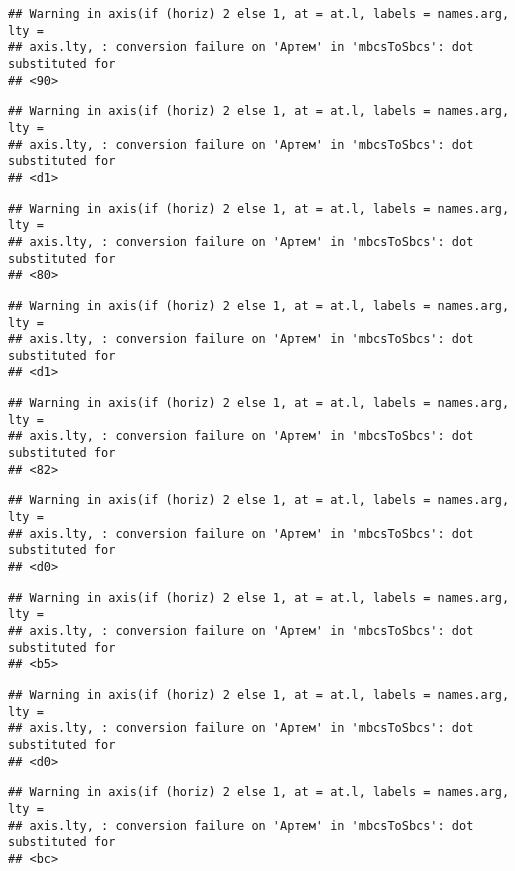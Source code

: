 \documentclass[
]{article}
\begin{document}
\begin{verbatim}
## Warning in axis(if (horiz) 2 else 1, at = at.l, labels = names.arg, lty =
## axis.lty, : conversion failure on 'Артем' in 'mbcsToSbcs': dot substituted for
## <90>
\end{verbatim}

\begin{verbatim}
## Warning in axis(if (horiz) 2 else 1, at = at.l, labels = names.arg, lty =
## axis.lty, : conversion failure on 'Артем' in 'mbcsToSbcs': dot substituted for
## <d1>
\end{verbatim}

\begin{verbatim}
## Warning in axis(if (horiz) 2 else 1, at = at.l, labels = names.arg, lty =
## axis.lty, : conversion failure on 'Артем' in 'mbcsToSbcs': dot substituted for
## <80>
\end{verbatim}

\begin{verbatim}
## Warning in axis(if (horiz) 2 else 1, at = at.l, labels = names.arg, lty =
## axis.lty, : conversion failure on 'Артем' in 'mbcsToSbcs': dot substituted for
## <d1>
\end{verbatim}

\begin{verbatim}
## Warning in axis(if (horiz) 2 else 1, at = at.l, labels = names.arg, lty =
## axis.lty, : conversion failure on 'Артем' in 'mbcsToSbcs': dot substituted for
## <82>
\end{verbatim}

\begin{verbatim}
## Warning in axis(if (horiz) 2 else 1, at = at.l, labels = names.arg, lty =
## axis.lty, : conversion failure on 'Артем' in 'mbcsToSbcs': dot substituted for
## <d0>
\end{verbatim}

\begin{verbatim}
## Warning in axis(if (horiz) 2 else 1, at = at.l, labels = names.arg, lty =
## axis.lty, : conversion failure on 'Артем' in 'mbcsToSbcs': dot substituted for
## <b5>
\end{verbatim}

\begin{verbatim}
## Warning in axis(if (horiz) 2 else 1, at = at.l, labels = names.arg, lty =
## axis.lty, : conversion failure on 'Артем' in 'mbcsToSbcs': dot substituted for
## <d0>
\end{verbatim}

\begin{verbatim}
## Warning in axis(if (horiz) 2 else 1, at = at.l, labels = names.arg, lty =
## axis.lty, : conversion failure on 'Артем' in 'mbcsToSbcs': dot substituted for
## <bc>
\end{verbatim}
\end{document}
